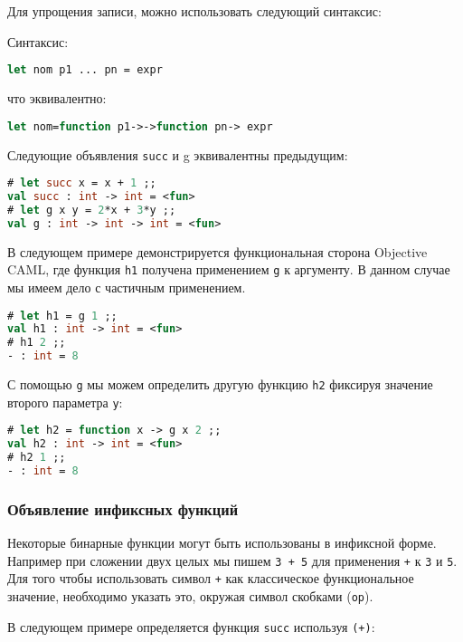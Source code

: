 Для упрощения записи, можно использовать следующий синтаксис:

Синтаксис:
\label{sec:def_func_val_let}

\begin{lstlisting}[language=OCaml]
let nom p1 ... pn = expr
\end{lstlisting}

что эквивалентно:

\begin{lstlisting}[language=OCaml]
let nom=function p1->->function pn-> expr
\end{lstlisting}

Следующие объявления \texttt{succ} и g эквивалентны предыдущим:

\begin{lstlisting}[language=OCaml]
# let succ x = x + 1 ;;
val succ : int -> int = <fun>
# let g x y = 2*x + 3*y ;;
val g : int -> int -> int = <fun>
\end{lstlisting}

В следующем примере демонстрируется функциональная сторона Objective CAML, где
функция \texttt{h1} получена применением \texttt{g} к аргументу. В данном случае
мы имеем дело с частичным применением.

\begin{lstlisting}[language=OCaml]
# let h1 = g 1 ;;
val h1 : int -> int = <fun>
# h1 2 ;;
- : int = 8
\end{lstlisting}

С помощью \texttt{g} мы можем определить другую функцию \texttt{h2} фиксируя
значение второго параметра \texttt{y}:

\begin{lstlisting}[language=OCaml]
# let h2 = function x -> g x 2 ;;
val h2 : int -> int = <fun>
# h2 1 ;;
- : int = 8
\end{lstlisting}

\subsubsection{Объявление инфиксных функций}

Некоторые бинарные функции могут быть использованы в инфиксной форме. Например
при сложении двух целых мы пишем \texttt{3 + 5} для применения \texttt{+} к
\texttt{3} и \texttt{5}. Для того чтобы использовать символ \texttt{+} как
классическое функциональное значение, необходимо указать это, окружая символ
скобками (\texttt{op}).

В следующем примере определяется функция \texttt{succ} используя \texttt{(+)}:

